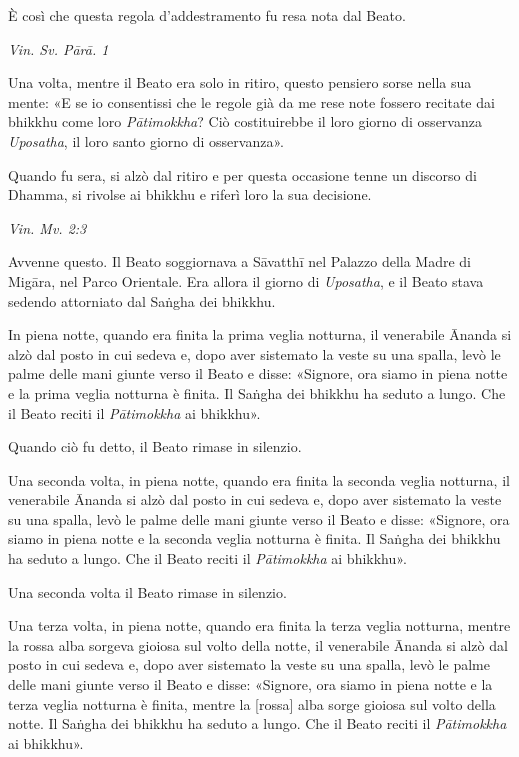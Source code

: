 È così che questa regola d’addestramento fu resa nota dal Beato.


\emph{Vin. Sv. Pārā. 1}


Una volta, mentre il Beato era solo in ritiro, questo pensiero sorse
nella sua mente: «E se io consentissi che le regole già da me rese note
fossero recitate dai bhikkhu come loro \emph{Pātimokkha}? Ciò costituirebbe
il loro giorno di osservanza \emph{Uposatha}, il loro santo giorno di
osservanza».


Quando fu sera, si alzò dal ritiro e per questa occasione tenne un
discorso di Dhamma, si rivolse ai bhikkhu e riferì loro la sua
decisione.


\emph{Vin. Mv. 2:3}


Avvenne questo. Il Beato soggiornava a Sāvatthī nel Palazzo della Madre
di Migāra, nel Parco Orientale. Era allora il giorno di \emph{Uposatha}, e il
Beato stava sedendo attorniato dal Saṅgha dei bhikkhu.


In piena notte, quando era finita la prima veglia notturna, il
venerabile Ānanda si alzò dal posto in cui sedeva e, dopo aver sistemato
la veste su una spalla, levò le palme delle mani giunte verso il Beato e
disse: «Signore, ora siamo in piena notte e la prima veglia notturna è
finita. Il Saṅgha dei bhikkhu ha seduto a lungo. Che il Beato reciti il
\emph{Pātimokkha} ai bhikkhu».


Quando ciò fu detto, il Beato rimase in silenzio.


Una seconda volta, in piena notte, quando era finita la seconda veglia
notturna, il venerabile Ānanda si alzò dal posto in cui sedeva e, dopo
aver sistemato la veste su una spalla, levò le palme delle mani giunte
verso il Beato e disse: «Signore, ora siamo in piena notte e la seconda
veglia notturna è finita. Il Saṅgha dei bhikkhu ha seduto a lungo. Che
il Beato reciti il \emph{Pātimokkha} ai bhikkhu».


Una seconda volta il Beato rimase in silenzio.


Una terza volta, in piena notte, quando era finita la terza veglia
notturna, mentre la rossa alba sorgeva gioiosa sul volto della notte, il
venerabile Ānanda si alzò dal posto in cui sedeva e, dopo aver sistemato
la veste su una spalla, levò le palme delle mani giunte verso il Beato e
disse: «Signore, ora siamo in piena notte e la terza veglia notturna è
finita, mentre la [rossa] alba sorge gioiosa sul volto della notte. Il
Saṅgha dei bhikkhu ha seduto a lungo. Che il Beato reciti il
\emph{Pātimokkha} ai bhikkhu».


